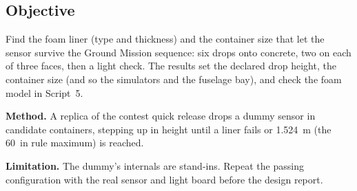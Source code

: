 \documentclass[final]{dbfdoc}
\begin{document}
\begin{frontmatter}
\section{Objective}
\noindent\begin{minipage}[t]{0.62\textwidth}
\setlength\parindent{1.15em}\noindent
Find the foam liner (type and thickness) and the container size that let the sensor survive the Ground Mission sequence: six drops onto concrete, two on each of three faces, then a light check. The results set the declared drop height, the container size (and so the simulators and the fuselage bay), and check the foam model in Script~5.

\noindent\textbf{Method.} A replica of the contest quick release drops a dummy sensor in candidate containers, stepping up in height until a liner fails or 1.524~m (the 60~in rule maximum) is reached.

\noindent\textbf{Limitation.} The dummy's internals are stand-ins. Repeat the passing configuration with the real sensor and light board before the design report.
\end{minipage}\hfill
\begin{minipage}[t]{0.35\textwidth}
\vspace{-11pt}
\begin{dbfpanel}
\hfill{}\dbfreadoutgap
{}\hfill{}\dbfreadoutgap
{}\hfill{}
\end{dbfpanel}
\end{minipage}
\end{frontmatter}
\end{document}
